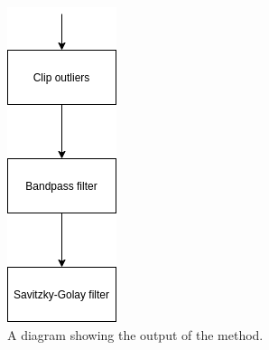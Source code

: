                     \begin{figure}
                        \centering
                        
                        \includegraphics[width=0.5\linewidth]{figures/pca_data_driven_surrogate_signal_extraction_methods_for_dynamic_pet_methods_data_driven_surrogate_signal_extraction_output.png}
                        
                        \captionsetup{singlelinecheck=false, justification=centering}
                        \caption{A diagram showing the output of the method.}
                        \label{fig:pca_data_driven_surrogate_signal_extraction_methods_for_dynamic_pet_methods_data_driven_surrogate_signal_extraction_output}
                    \end{figure}
                    
